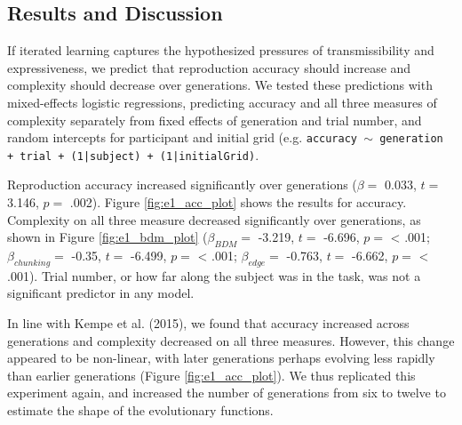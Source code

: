 \documentclass[10pt, letterpaper]{article}
\begin{document}
\subsection{Results and Discussion}\label{results-and-discussion}

If iterated learning captures the hypothesized pressures of
transmissibility and expressiveness, we predict that reproduction
accuracy should increase and complexity should decrease over
generations. We tested these predictions with mixed-effects logistic
regressions, predicting accuracy and all three measures of complexity
separately from fixed effects of generation and trial number, and random
intercepts for participant and initial grid (e.g.
\texttt{accuracy $\sim$ generation + trial +  (1|subject) + (1|initialGrid)}.

Reproduction accuracy increased significantly over generations
(\(\beta =\) 0.033, \(t =\) 3.146, \(p =\) .002). Figure
\ref{fig:e1_acc_plot} shows the results for accuracy. Complexity on all
three measure decreased significantly over generations, as shown in
Figure \ref{fig:e1_bdm_plot} (\(\beta_{BDM} =\) -3.219, \(t =\) -6.696,
\(p =\) \textless{} .001; \(\beta_{chunking} =\) -0.35, \(t =\) -6.499,
\(p =\) \textless{} .001; \(\beta_{edge} =\) -0.763, \(t =\) -6.662,
\(p =\) \textless{} .001). Trial number, or how far along the subject
was in the task, was not a significant predictor in any model.

In line with Kempe et al. (2015), we found that accuracy increased
across generations and complexity decreased on all three measures.
However, this change appeared to be non-linear, with later generations
perhaps evolving less rapidly than earlier generations (Figure
\ref{fig:e1_acc_plot}). We thus replicated this experiment again, and
increased the number of generations from six to twelve to estimate the
shape of the evolutionary functions.
\end{document}
